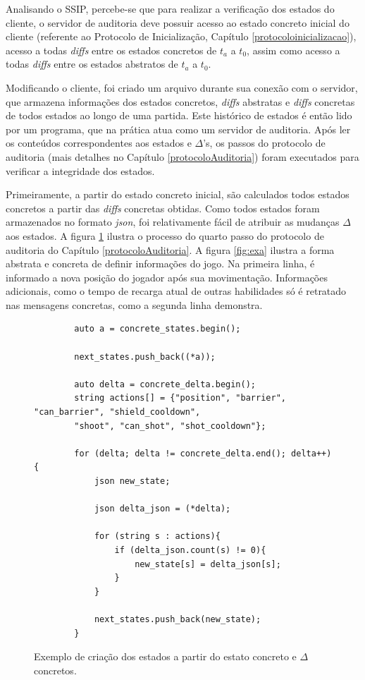 Analisando o SSIP, percebe-se que para realizar a verificação dos estados do cliente, o servidor de auditoria deve possuir acesso ao estado concreto inicial do cliente (referente ao Protocolo de Inicialização, Capítulo \ref{protocoloinicializacao}), acesso a todas \textit{diffs} entre os estados concretos de $t_a$ a $t_0$, assim como acesso a todas \textit{diffs} entre os estados abstratos de $t_a$ a $t_0$.

Modificando o cliente, foi criado um arquivo durante sua conexão com o servidor, que armazena informações dos estados concretos, \textit{diffs} abstratas e \textit{diffs} concretas de todos estados ao longo de uma partida. 
Este histórico de estados é então lido por um programa, que na prática atua como um servidor de auditoria. Após ler os conteúdos correspondentes aos estados e $\Delta$'s, os passos do protocolo de auditoria (mais detalhes no Capítulo \ref{protocoloAuditoria}) foram executados para verificar a integridade dos estados. 

Primeiramente, a partir do estado concreto inicial, são calculados todos estados concretos a partir das \textit{diffs} concretas obtidas. 
Como todos estados foram armazenados no formato \textit{json}, foi relativamente fácil de atribuir as mudanças $\Delta$ aos estados. A figura \ref{clientestep} ilustra o processo do quarto passo do protocolo de auditoria do Capítulo \ref{protocoloAuditoria}. A figura \ref{fig:exa} ilustra a forma abstrata e concreta de definir informações do jogo. Na primeira linha, é informado a nova posição do jogador após sua movimentação. Informações adicionais, como o tempo de recarga atual de outras habilidades só é retratado nas mensagens concretas, como a segunda linha demonstra. 


\begin{figure}
    \begin{lstlisting}
        auto a = concrete_states.begin();

        next_states.push_back((*a));

        auto delta = concrete_delta.begin();
        string actions[] = {"position", "barrier", "can_barrier", "shield_cooldown", 
        "shoot", "can_shot", "shot_cooldown"};

        for (delta; delta != concrete_delta.end(); delta++){
            json new_state;

            json delta_json = (*delta);

            for (string s : actions){
                if (delta_json.count(s) != 0){
                    new_state[s] = delta_json[s];
                }
            }

            next_states.push_back(new_state);
        }

    \end{lstlisting}
    \caption[Exemplo de criação dos estados a partir do estato concreto e $\Delta$ concretos.]{Exemplo de criação dos estados a partir do estato concreto e $\Delta$ concretos.}
    \label{clientestep}  
\end{figure}


